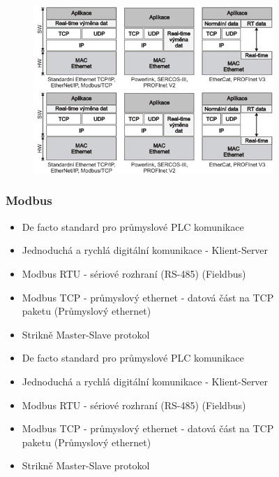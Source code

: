 \begin{figure}[h]
\begin{figure}[h]
  \begin{center}
    \includegraphics[scale = 1]{img/Picture19.png}
  \end{center}
    \begin{center}
        \includegraphics[scale = 1]{img/Picture19.png}
    \end{center}
\end{figure}

\subsubsection*{Modbus}
\begin{itemize}
  \item De facto standard pro průmyslové PLC komunikace
  \item Jednoduchá a rychlá digitální komunikace - Klient-Server
  \item Modbus RTU - sériové rozhraní (RS-485) (Fieldbus)
  \item Modbus TCP - průmyslový ethernet - datová část na TCP paketu (Průmyslový ethernet)
  \item Strikně Master-Slave protokol
    \item De facto standard pro průmyslové PLC komunikace
    \item Jednoduchá a rychlá digitální komunikace - Klient-Server
    \item Modbus RTU - sériové rozhraní (RS-485) (Fieldbus)
    \item Modbus TCP - průmyslový ethernet - datová část na TCP paketu (Průmyslový ethernet)
    \item Strikně Master-Slave protokol
\end{itemize}


\end{figure}
